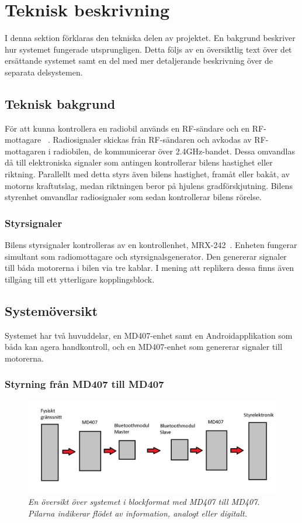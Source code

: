 \documentclass[a4paper]{article}
\begin{document}
\newpage
\section{Teknisk beskrivning}
I denna sektion förklaras den tekniska delen av projektet. En bakgrund beskriver hur systemet fungerade utsprungligen. Detta följs av en översiktlig text över det ersättande systemet samt en del med mer detaljerande beskrivning över de separata delsystemen.


\subsection{Teknisk bakgrund}
För att kunna kontrollera en radiobil används en RF-sändare och en RF-mottagare ~\cite{RCTechnique}. Radiosignaler skickas från RF-sändaren och avkodas av RF-mottagaren i radiobilen, de kommunicerar över 2.4GHz-bandet. Dessa omvandlas då till elektroniska signaler som antingen kontrollerar bilens hastighet eller riktning. Parallellt med detta styrs även bilens hastighet, framåt eller bakåt, av motorns kraftutslag, medan riktningen beror på hjulens gradförskjutning. Bilens styrenhet omvandlar radiosignaler som sedan kontrollerar bilens rörelse.

\subsubsection{Styrsignaler}
Bilens styrsignaler kontrolleras av en kontrollenhet, MRX-242~\cite{projektDir}. Enheten fungerar simultant som radiomottagare och styrsignalsgenerator. Den genererar signaler till båda motorerna i bilen via tre kablar. I mening att replikera dessa finns även tillgång till ett ytterligare kopplingsblock.


\subsection{Systemöversikt}
Systemet har två huvuddelar, en MD407-enhet samt en Androidapplikation som båda kan agera handkontroll, och en MD407-enhet som genererar signaler till motorerna.

\subsubsection{Styrning från MD407 till MD407}
\begin{figure}[H]
\includegraphics[width=\textwidth]{systemoversikt.jpg}
\centering
\caption{\it En översikt över systemet i blockformat med MD407 till MD407. Pilarna indikerar flödet av information, analogt eller digitalt.}
\end{figure} 
\end{document}
